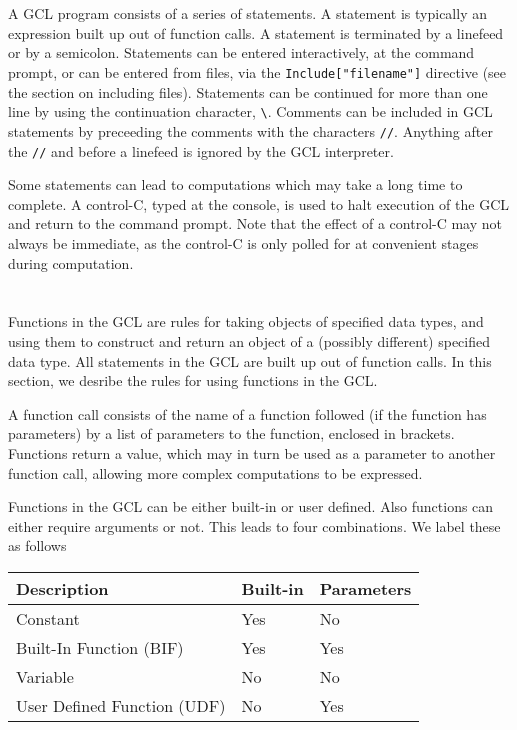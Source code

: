 \section{}

A GCL program consists of a series of statements.  A statement is
typically an expression built up out of function calls.  A statement
is terminated by a linefeed or by a semicolon.  Statements can be
entered interactively, at the command prompt, or can be entered from
files, via the \verb+Include["filename"]+ directive (see the section
on including files).  Statements can be continued for more than one
line by using the continuation character, \verb+\+.  Comments can be
included in GCL statements by preceeding the comments with the
characters \verb+//+.  Anything after the \verb+//+ and before a
linefeed is ignored by the GCL interpreter.

Some statements can lead to computations which may take a long time to
complete.  A control-C, typed at the console, is used to halt
execution of the GCL and return to the command prompt.  Note that the
effect of a control-C may not always be immediate, as the control-C is
only polled for at convenient stages during computation.

\section{}

Functions in the GCL are rules for taking objects of specified data
types, and using them to construct and return an object of a (possibly
different) specified data type.  All statements in the GCL are built
up out of function calls.  In this section, we desribe the rules for
using functions in the GCL.

A function call consists of the name of a function followed (if the
function has parameters) by a list of parameters to the function,
enclosed in brackets.  Functions return a value, which may in turn
be used as a parameter to another function call, allowing more complex
computations to be expressed.

Functions in the GCL can be either built-in or user defined.  Also
functions can either require arguments or not.  This leads to four
combinations.  We label these as follows

\medskip
\begin{tabular} {|l|ll|} 
Description & Built-in & Parameters\\ 
\hline
Constant & Yes & No \\ 
Built-In Function (BIF) & Yes & Yes \\ 
Variable & No & No \\ 
User Defined Function (UDF) & No & Yes \\ 
\hline
\end{tabular}

